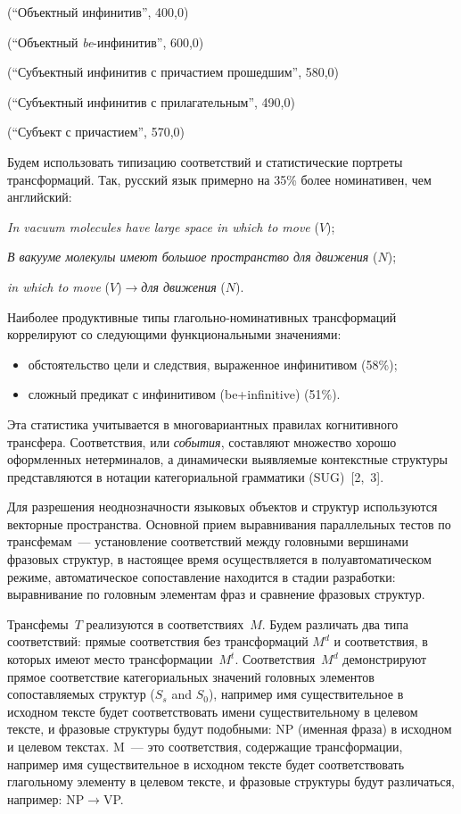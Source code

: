 \begin{multicols}{2}
     (``Объектный инфинитив'', 400,0)

     (``Объектный \textit{be}-инфинитив'', 600,0)

     (``Субъектный инфинитив с причастием прошедшим'', 580,0)

     (``Субъектный инфинитив с прилагательным'', 490,0)

     (``Субъект с причастием'', 570,0)

     Будем использовать типизацию соответствий и статистические портреты
трансформаций. Так, русский язык примерно на 35\% более номинативен, чем
английский:

     \textit{In vacuum molecules have large space in which to move} ($V$);

     \textit{В вакууме молекулы имеют большое пространство для движения}
($N$);

     \textit{in which to move} ($V$)\;$\rightarrow$\;\textit{для движения} ($N$).

     Наиболее продуктивные типы глагольно-но\-ми\-на\-тив\-ных трансформаций
коррелируют со следующими функциональными значениями:
     \begin{itemize}
\item обстоятельство цели и следствия, выраженное инфинитивом (58\%);
\item сложный предикат с инфинитивом (be\;+\;infinitive) (51\%).
\end{itemize}

   Эта статистика учитывается в многовариантных правилах когнитивного
трансфера. Соответствия, или \textit{события}, составляют множество хорошо
оформленных нетерминалов, а динамически выявляемые контекстные структуры
представляются в нотации категориальной грамматики (SUG)~[2,~3].

   Для разрешения неоднозначности языковых объектов и структур используются
векторные пространства. Основной прием выравнивания параллельных тестов по
трансфемам~--- установление соответствий между головными вершинами
фразовых структур, в настоящее время осуществляется в полуавтоматическом
режиме, автоматическое сопоставление находится в стадии разработки:
выравнивание по головным элементам фраз и сравнение фразовых структур.

   Трансфемы~$T$ реализуются в соответствиях~$M$. Будем различать два типа
соответствий: прямые соответствия без трансформаций $M^d$  и соответствия, в
которых имеют место трансформации~$M^t$.  Соответствия~$M^d$ демонстрируют прямое соответствие
категориальных значений головных элементов сопоставляемых структур ($S_s$  and
$S_0$), например имя существительное в исходном тексте будет соответствовать
имени существительному в целевом тексте, и фразовые структуры будут
подобными: NP (именная фраза) в исходном и целевом текстах.
      M~--- это соответствия, содержащие трансформации, например имя
существительное в исходном тексте будет соответствовать глагольному элементу
в целевом тексте, и фразовые структуры будут различаться, например:
NP\;$\rightarrow$\;VP.


\end{multicols}
